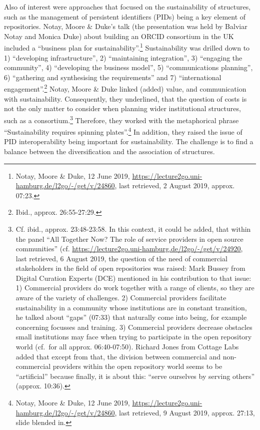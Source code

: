 \documentclass[a4paper,
fontsize=11pt,
oneside,
numbers=noperiodatend,
parskip=half-,
bibliography=totoc,
final
]{scrartcl}
\begin{document}
Also of interest were approaches that focused on the sustainability of
structures, such as the management of persistent identifiers (PIDs)
being a key element of repositories. Notay, Moore \& Duke's talk (the
presentation was held by Balviar Notay and Monica Duke) about building
an ORCID consortium in the UK included a \enquote{business plan for
sustainability}.\footnote{Notay, Moore \& Duke, 12 June 2019,
  \url{https://lecture2go.uni-hamburg.de/l2go/-/get/v/24860}, last
  retrieved, 2 August 2019, approx. 07:23.} Sustainability was drilled
down to 1) \enquote{developing infrastructure}, 2) \enquote{maintaining
integration}, 3) \enquote{engaging the community}, 4)
\enquote{developing the business model}, 5) \enquote{communications
planning}, 6) \enquote{gathering and synthesising the requirements} and
7) \enquote{international engagement}.\footnote{Ibid., approx.
  26:55-27:29.} Notay, Moore \& Duke linked (added) value, and
communication with sustainability. Consequently, they underlined, that
the question of costs is not the only matter to consider when planning
wider institutional structures, such as a consortium.\footnote{Cf.
  ibid., approx. 23:48-23:58. In this context, it could be added, that
  within the panel \enquote{All Together Now? The role of service
  providers in open source communities} (cf.
  \url{https://lecture2go.uni-hamburg.de/l2go/-/get/v/24920}, last
  retrieved, 6 August 2019, the question of the need of commercial
  stakeholders in the field of open repositories was raised: Mark Bussey
  from Digital Curation Experts (DCE) mentioned in his contribution to
  that issue: 1) Commercial providers do work together with a range of
  clients, so they are aware of the variety of challenges. 2) Commercial
  providers facilitate sustainability in a community whose institutions
  are in constant transition, he talked about \enquote{gaps} (07:33)
  that naturally come into being, for example concerning focusses and
  training. 3) Commercial providers decrease obstacles small
  institutions may face when trying to participate in the open
  repository world (cf.~for all approx. 06:40-07:50). Richard Jones from
  Cottage Labs added that except from that, the division between
  commercial and non-commercial providers within the open repository
  world seems to be \enquote{artificial} because finally, it is about
  this: \enquote{serve ourselves by serving others} (approx. 10:36).}
Therefore, they worked with the metaphorical phrase
\enquote{Sustainability requires spinning plates}.\footnote{Notay, Moore
  \& Duke, 12 June 2019,
  \url{https://lecture2go.uni-hamburg.de/l2go/-/get/v/24860}, last
  retrieved, 9 August 2019, approx. 27:13, slide blended in.} In
addition, they raised the issue of PID interoperability being important
for sustainability. The challenge is to find a balance between the
diversification and the association of structures.
\end{document}
